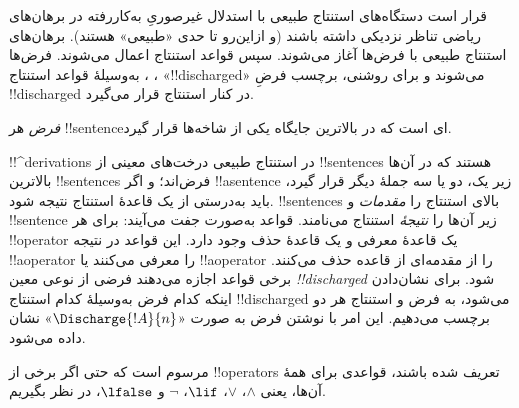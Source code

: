 \documentclass[../../../include/open-logic-section]{subfiles}
\begin{document}
      {}
      {}


\begin{explain}
قرار است دستگاه‌های استنتاج طبیعی با استدلال غیرصوریِ به‌کاررفته در
برهان‌های ریاضی تناظر نزدیکی داشته باشند (و ازاین‌رو تا حدی «طبیعی»
هستند). برهان‌های استنتاج طبیعی با فرض‌ها آغاز می‌شوند. سپس قواعد
استنتاج اعمال می‌شوند. فرض‌ها به‌وسیلهٔ قواعد استنتاج
\Intro{\lnot}، \Intro{\lif}،  «!!{discharged}» می‌شوند و برای
روشنی، برچسب فرضِ !!{discharged} در کنار استنتاج قرار می‌گیرد.
\end{explain}

\begin{defn}[فرض]
\emph{فرض} هر !!{sentence}ای است که در بالاترین جایگاه یکی از شاخه‌ها
قرار گیرد.
\end{defn}

!!^{derivation}s در استنتاج طبیعی درخت‌های معینی از !!{sentence}s
هستند که در آن‌ها بالاترین !!{sentence}s فرض‌اند؛ و اگر
!!a{sentence} زیر یک، دو یا سه جملهٔ دیگر قرار گیرد، باید به‌درستی از
یک قاعدهٔ استنتاج نتیجه شود. !!{sentence}s بالای استنتاج را
\emph{مقدمات} و !!{sentence} زیر آن‌ها را \emph{نتیجهٔ} استنتاج
می‌نامند. قواعد به‌صورت جفت می‌آیند: برای هر !!{operator} یک قاعدهٔ
معرفی و یک قاعدهٔ حذف وجود دارد. این قواعد در نتیجه !!a{operator} را
معرفی می‌کنند یا !!a{operator} را از مقدمه‌ای از قاعده حذف می‌کنند.
برخی قواعد اجازه می‌دهند فرضی از نوعی معین \emph{!!{discharged}} شود.
برای نشان‌دادن اینکه کدام فرض به‌وسیلهٔ کدام استنتاج !!{discharged}
می‌شود، به فرض و استنتاج هر دو برچسب می‌دهیم. این امر با نوشتن فرض به
صورت «$\Discharge{!A}{n}$» نشان داده می‌شود.


%
	{مرسوم است که حتی اگر برخی از !!{operator}s تعریف شده باشند، قواعدی برای همهٔ آن‌ها، یعنی $\land$، $\lor$، $\lif$، $\lnot$ و $\lfalse$، در نظر بگیریم.}
\end{document}
